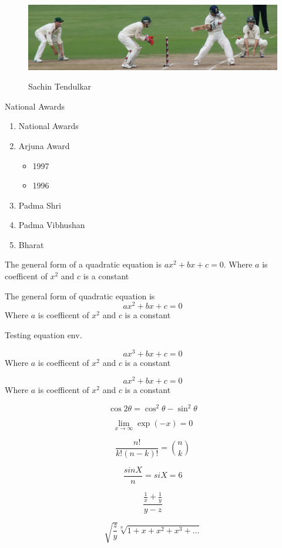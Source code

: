 \documentclass{report}
\begin{document}
\begin{figure}
	\centering
	\includegraphics[scale=0.5]{Sachin-02}
	\label{sachinface}
	\caption{Sachin Tendulkar}
	
\end{figure}

National Awards
\begin{enumerate}
	\item National Awards
	\item Arjuna Award
		\begin{itemize}
			\item 1997
			\item 1996
		\end{itemize}
	\item Padma Shri
	\item Padma Vibhushan
	\item Bharat

\end{enumerate}

The general form of a quadratic equation is $ax^2+bx+c=0$. Where  $a$ is coefficent of $x^2$ and $c$ is a constant

The general form of quadratic equation is 
\begin{displaymath}
	ax^2+bx+c=0
\end{displaymath}
Where  $a$ is coefficent of $x^2$ and $c$ is a constant


Testing equation env.

\begin{equation}
	ax^3+bx+c=0
\end{equation}
Where  $a$ is coefficent of $x^2$ and $c$ is a constant


\begin{equation}
	ax^2+bx+c=0
\end{equation}
Where  $a$ is coefficent of $x^2$ and $c$ is a constant



\begin{equation}
	\cos 2\theta = \cos^2\theta - \sin^2\theta
\end{equation}

\begin{equation}
	\lim_{x \to \infty} \exp(-x) = 0
\end{equation}

\begin{equation}
	\frac{n!}{k!(n-k)!} = \binom{n}{k} 
\end{equation}

\begin{equation}
	\frac{sinX}{n} = siX = 6
\end{equation}

\begin{equation}
	\frac{\frac{1}{x}+\frac{1}{y}}{y-z}
\end{equation}

\begin{equation}
	\sqrt{\frac{z}{y}}
	\sqrt[n]{1+x+x^2+x^3+\ldots}
\end{equation}
\end{document}
